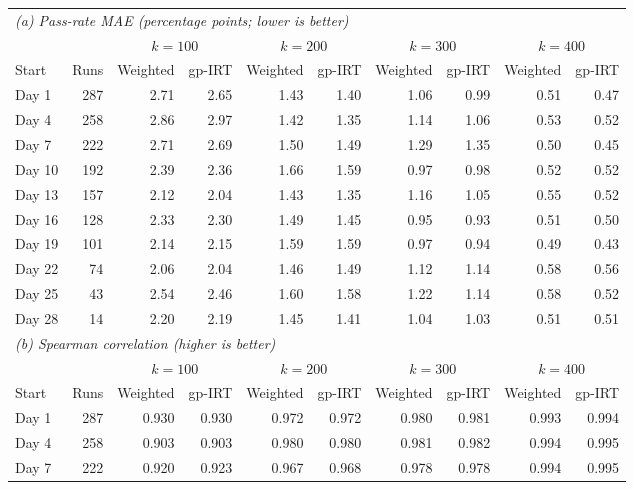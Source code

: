 \begin{table}[t]
  \centering
  \scriptsize
  \setlength{\tabcolsep}{2.8pt}
  \begin{tabular}{lrrrrrrrrr}
    \toprule
    \multicolumn{10}{l}{\textit{(a) Pass-rate MAE (percentage points; lower is better)}} \\
    \multicolumn{2}{c}{} & \multicolumn{2}{c}{${k=100}$} & \multicolumn{2}{c}{${k=200}$} & \multicolumn{2}{c}{${k=300}$} & \multicolumn{2}{c}{${k=400}$} \\
    Start & Runs & Weighted & gp-IRT & Weighted & gp-IRT & Weighted & gp-IRT & Weighted & gp-IRT \\
    \midrule
    Day 1 & 287 & 2.71 & 2.65 & 1.43 & 1.40 & 1.06 & 0.99 & 0.51 & 0.47 \\
    Day 4 & 258 & 2.86 & 2.97 & 1.42 & 1.35 & 1.14 & 1.06 & 0.53 & 0.52 \\
    Day 7 & 222 & 2.71 & 2.69 & 1.50 & 1.49 & 1.29 & 1.35 & 0.50 & 0.45 \\
    Day 10 & 192 & 2.39 & 2.36 & 1.66 & 1.59 & 0.97 & 0.98 & 0.52 & 0.52 \\
    Day 13 & 157 & 2.12 & 2.04 & 1.43 & 1.35 & 1.16 & 1.05 & 0.55 & 0.52 \\
    Day 16 & 128 & 2.33 & 2.30 & 1.49 & 1.45 & 0.95 & 0.93 & 0.51 & 0.50 \\
    Day 19 & 101 & 2.14 & 2.15 & 1.59 & 1.59 & 0.97 & 0.94 & 0.49 & 0.43 \\
    Day 22 & 74 & 2.06 & 2.04 & 1.46 & 1.49 & 1.12 & 1.14 & 0.58 & 0.56 \\
    Day 25 & 43 & 2.54 & 2.46 & 1.60 & 1.58 & 1.22 & 1.14 & 0.58 & 0.52 \\
    Day 28 & 14 & 2.20 & 2.19 & 1.45 & 1.41 & 1.04 & 1.03 & 0.51 & 0.51 \\
    \midrule
    \multicolumn{10}{l}{\textit{(b) Spearman correlation (higher is better)}} \\
    \multicolumn{2}{c}{} & \multicolumn{2}{c}{${k=100}$} & \multicolumn{2}{c}{${k=200}$} & \multicolumn{2}{c}{${k=300}$} & \multicolumn{2}{c}{${k=400}$} \\
    Start & Runs & Weighted & gp-IRT & Weighted & gp-IRT & Weighted & gp-IRT & Weighted & gp-IRT \\
    \midrule
    Day 1 & 287 & 0.930 & 0.930 & 0.972 & 0.972 & 0.980 & 0.981 & 0.993 & 0.994 \\
    Day 4 & 258 & 0.903 & 0.903 & 0.980 & 0.980 & 0.981 & 0.982 & 0.994 & 0.995 \\
    Day 7 & 222 & 0.920 & 0.923 & 0.967 & 0.968 & 0.978 & 0.978 & 0.994 & 0.995 \\

\end{tabular}
\end{table}
